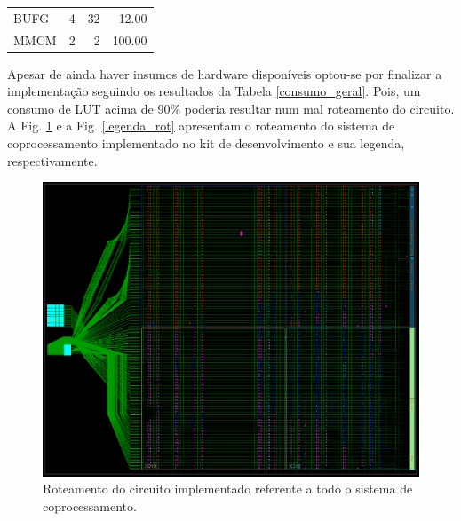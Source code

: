 \begin{table}[!h]
\begin{tabular}{lrrr}
		BUFG                                                          & 4                                                               & 32                                                              & 12.00                                                                \\
		\rowcolor[HTML]{DAE8FC} 
		MMCM                                                          & 2                                                               & 2                                                               & 100.00                                                              
	\end{tabular}
\end{table}

Apesar de ainda haver insumos de hardware disponíveis optou-se por finalizar a implementação seguindo os resultados da Tabela \ref{consumo_geral}. Pois, um consumo de LUT acima de 90\% poderia resultar num mal roteamento do circuito.\\

A Fig. \ref{roteamento} e a Fig. \ref{legenda_rot} apresentam o roteamento do sistema de coprocessamento implementado no kit de desenvolvimento e sua legenda, respectivamente.
\begin{figure}[!h]
	\centering
	\includegraphics[keepaspectratio=true,scale=0.40]{figuras/roteamento.png}
	\caption{Roteamento do circuito implementado referente a todo o sistema de coprocessamento.}
	\label{roteamento}
\end{figure}


